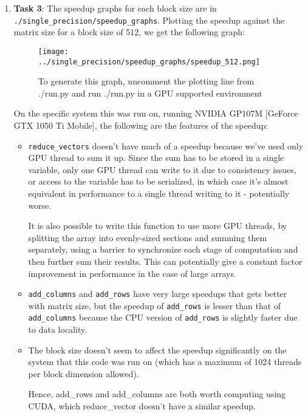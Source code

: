 \documentclass[fleqn, 11pt]{article}
\begin{document}
\begin{enumerate}
 \item \textbf{Task 3}:  The speedup graphs for each block size are in \texttt{./single\_precision/speedup\_graphs}. Plotting the speedup against the matrix size for a block size of 512, we get the following graph:
 
\begin{figure}[h]
\texttt{[image: ../single\_precision/speedup\_graphs/speedup\_512.png]}
\centering 
\caption*{{\tiny To generate this graph, uncomment the plotting line from ./run.py and run ./run.py in a GPU supported environment}}
\end{figure} 
\par
On the specific system this was run on, running NVIDIA GP107M [GeForce GTX 1050 Ti Mobile],  the following are the features of the speedup:
 \begin{itemize}
        \item \texttt{reduce\_vectors} doesn't have much of a speedup because we've used only GPU thread to sum it up. Since the sum has to be stored in a single variable, only one GPU thread can write to it due to consistency issues, or access to the variable has to be serialized, in which case it's almost equivalent in performance to a single thread writing to it - potentially worse.
        
        It is also possible to write this function to use more GPU threads, by splitting the array into evenly-sized sections and summing them separately, using a barrier to synchronize each stage of computation and then further sum their results. This can potentially give a constant factor improvement in performance in the case of large arrays.
        
        \item \texttt{add\_columns} and \texttt{add\_rows} have very large speedups that gets better with matrix size, but the speedup of \texttt{add\_rows} is lesser than that of \texttt{add\_columns} because the CPU  version of \texttt{add\_rows} is slightly faster due to data locality.
        
        \item The block size doesn't seem to affect the speedup significantly on the system that this code was run on (which has a maximum of 1024 threads per block dimension allowed).

Hence, add\_rows and add\_columns are both worth computing using CUDA, which reduce\_vector doesn't have a similar speedup.
        
\end{itemize}
       


\end{enumerate}
\end{document}
